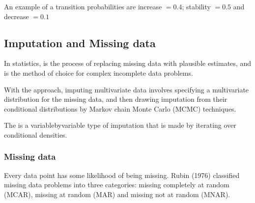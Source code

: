 \documentclass[a4paper,12pt,english]{sphinxhowto}
\begin{document}
An example of a transition probabilities are increase \(=0.4\); stability \(=0.5\) and decrease \(=0.1\)



\subsection{Imputation and Missing data}
\label{\detokenize{Uncertainty:imputation-and-missing-data}}\label{\detokenize{Uncertainty:missing}}
In statistics,  is the process of replacing missing data with plausible estimates,
and  is the method of choice for complex incomplete data problems.

With the  approach, imputing multivariate data involves specifying a
multivariate distribution for the missing data, and then drawing imputation from their
conditional distributions by Markov chain Monte Carlo (MCMC) techniques.

The  is a variable\sphinxhyphen{}by\sphinxhyphen{}variable type of imputation that is
made by iterating over conditional densities.



\subsubsection{Missing data}
\label{\detokenize{Uncertainty:missing-data}}
Every data point has some likelihood of being missing. Rubin (1976) classified missing data problems
into three categories: missing completely at random (MCAR), missing at random (MAR) and missing not at random (MNAR).
\end{document}
